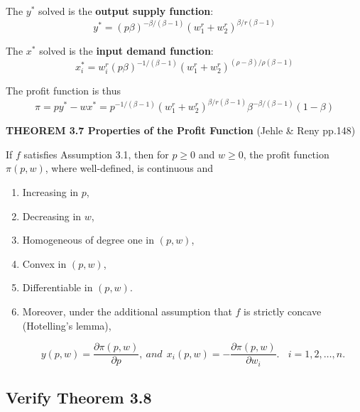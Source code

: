 \documentclass{article}
\begin{document}
\begin{mdframed}[backgroundcolor=blue!20,linecolor=white]
The $y^*$ solved is the \textbf{output supply function}:
$$y^* = (p\beta)^{-\beta /(\beta - 1)}(w_1^r + w_2^r)^{\beta / r(\beta -1)}$$

The $x^*$ solved is the \textbf{input demand function}:
$$x_i^* = w_i^r  (p\beta)^{-1 /(\beta - 1)}(w_1^r + w_2^r)^{(\rho -\beta) / \rho(\beta -1)}$$

The profit function is thus $$\pi = py^* - wx^* = p^{-1/(\beta - 1)} (w_1^r + w_2^r)^{\beta / r(\beta -1)}\beta^{-\beta /(\beta - 1)}(1-\beta)$$

\textbf{THEOREM 3.7 Properties of the Profit Function} (Jehle \& Reny pp.148)

If $f$ satisfies Assumption 3.1, then for $p \ge 0$ and $w \ge 0$, the profit function $\pi (p,w)$, where well-defined, is continuous and

\begin{enumerate}

\item Increasing in $p$,
\item Decreasing in $w$,
\item Homogeneous of degree one in $(p,w)$,
\item Convex in $(p,w)$,
\item Differentiable in $(p,w)$.
\item Moreover, under the additional assumption that $f$ is strictly concave \\ (Hotelling's lemma),

$$y(p,w) = \frac{\partial \pi(p,w)}{\partial p},\ and \ \ x_i(p,w) = - \frac{\partial \pi(p,w)}{\partial w_i}. \ \ \ \ i = 1,2, \dots , n.$$


\end{enumerate}


\end{mdframed}




\subsection{Verify Theorem 3.8}
\end{document}
